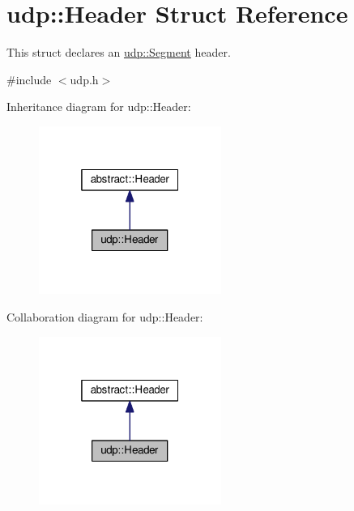 \hypertarget{structudp_1_1Header}{}\section{udp\+:\+:Header Struct Reference}
\label{structudp_1_1Header}


This struct declares an \hyperlink{structudp_1_1Segment}{udp\+::\+Segment} header.  




{\ttfamily \#include $<$udp.\+h$>$}



Inheritance diagram for udp\+:\+:Header\+:\nopagebreak
\begin{figure}[H]
\begin{center}
\leavevmode
\includegraphics[width=169pt]{structudp_1_1Header__inherit__graph}
\end{center}
\end{figure}


Collaboration diagram for udp\+:\+:Header\+:\nopagebreak
\begin{figure}[H]
\begin{center}
\leavevmode
\includegraphics[width=169pt]{structudp_1_1Header__coll__graph}
\end{center}
\end{figure}
